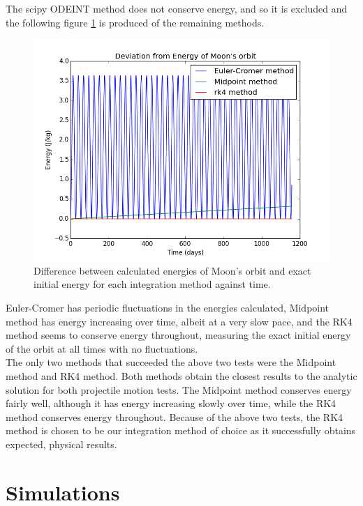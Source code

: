\documentclass[10pt,letterpaper]{article}
\begin{document}
The scipy ODEINT method does not conserve energy, and so it is excluded and the following figure \ref{fig:Energy_conservation_good_methods_no_ODEINT} is produced of the remaining methods.\\

\begin{figure}[!htb]
\centering
\includegraphics[scale=0.6]{figures/test_cases/Energy_conservation_good_methods_no_ODEINT.png}
\caption{Difference between calculated energies of Moon's orbit and exact initial energy for each integration method against time.}\label{fig:Energy_conservation_good_methods_no_ODEINT}
\end{figure}

Euler-Cromer has periodic fluctuations in the energies calculated, Midpoint method has energy increasing over time, albeit at a very slow pace, and the RK4 method seems to conserve energy throughout, measuring the exact initial energy of the orbit at all times with no fluctuations.\\

The only two methods that succeeded the above two tests were the Midpoint method and RK4 method. Both methods obtain the closest results to the analytic solution for both projectile motion tests. The Midpoint method conserves energy fairly well, although it has energy increasing slowly over time, while the RK4 method conserves energy throughout. Because of the above two tests, the RK4 method is chosen to be our integration method of choice as it successfully obtains expected, physical results.\\

\section{Simulations}
\end{document}
